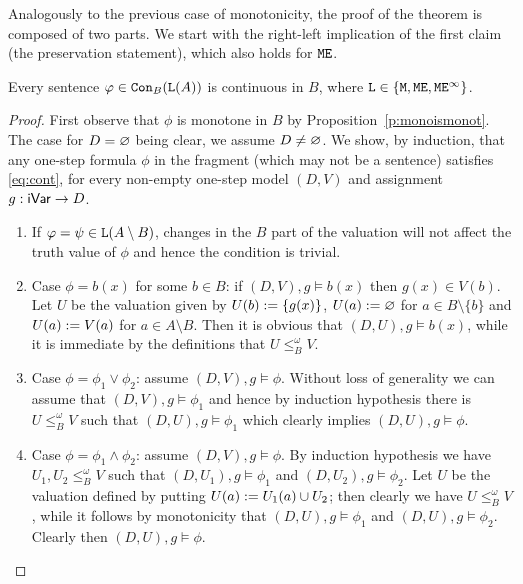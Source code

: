 Analogously to the previous case of monotonicity, the proof of the theorem is 
composed of two parts.  
We start with the right-left implication of the first claim (the preservation
statement), which also holds for $\ofoe$.

\begin{proposition}\label{p:coniscont}
Every sentence $\phi \in \cont{\llang(A)}{B}$ is continuous in $B$,
where $\llang\in\{ \ofo, \ofoe, \ofoei \}$.
\end{proposition}

\begin{proof}
First observe that $\phi$ is monotone in $B$ by 
Proposition~\ref{p:monoismonot}.
The case for $D=\nada$ being clear, we assume $D\neq\nada$.
We show, by induction, that any one-step formula $\phi$ in the fragment (which
may not be a sentence) satisfies \eqref{eq:cont}, for every non-empty one-step
model $(D, V)$ and assignment ${ g:\fovar\to D}$.
%
\begin{enumerate}[\textbullet]
\item 
If $\phi = \psi \in \llang(A\setminus B)$, changes in the $B$ part of the 
valuation will not affect the truth value of $\phi$ and hence the condition is 
trivial. 

\item
Case $\phi = b(x)$ for some $b \in B$: if $(D, V), g \models b(x)$ then 
$g(x)\in  V(b)$. 
Let $U$ be the valuation given by $U(b) \isdef \{ g(x) \}$,
$U(a) \isdef \nada$ for $a \in B \setminus \{b \}$ and
$U(a) \isdef V(a)$ for $a \in A \setminus B$.
Then it is obvious that $(D,  U), g \models b(x)$, while it is immediate by the
definitions that $U \leq^{\omega}_{B} V$.

\item 
Case $\phi = \phi_1 \lor \phi_2$: assume $(D, V), g \models \phi$. 
Without loss of generality we can assume that $(D, V), g \models \phi_1$ and 
hence by induction hypothesis there is $U \leq^{\omega}_{B} V$ such that $(D, U),
g \models \phi_1$ which clearly implies $(D, U), g \models 
\phi$. 

\item 
Case $\phi = \phi_1 \land \phi_2$: assume $(D, V), g \models \phi$. 
By induction hypothesis we have $U_1,U_2 \leq^{\omega}_{B} V$ such that 
$(D,U_{1}), g \models \phi_1$ and $(D, U_2), g \models \phi_2$.
Let $U$ be the valuation defined by putting $U(a) \isdef U_{1}(a) \cup U_{2}$; 
then clearly we have $U \leq^{\omega}_{B} V$, while it follows by monotonicity
that $(D,U), g \models \phi_1$ and $(D, U), g \models \phi_2$.
Clearly then $(D, U), g \models \phi$.


\end{enumerate}
\end{proof}
